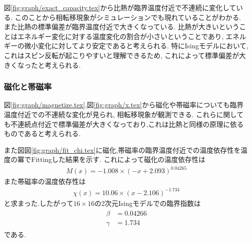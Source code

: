 図\ref{fig:graph/exact_capacity.tex}から比熱が臨界温度付近で不連続に変化している.
このことから相転移現象がシミュレーションでも現れていることがわかる.
また比熱の標準偏差が臨界温度付近で大きくなっている.
比熱が大きいということはエネルギー変化に対する温度変化の割合が小さいということであり,
エネルギーの微小変化に対してより安定であると考えられる.
特にIsingモデルにおいて,これはスピン反転が起こりやすいと理解できるため,
これによって標準偏差が大きくなったと考えられる.
\subsubsection{磁化と帯磁率}
図\ref{fig:graph/magnetize.tex},図\ref{fig:graph/x.tex}から磁化や帯磁率についても臨界温度付近での不連続な変化が見られ,
相転移現象が観測できる.
これらに関しても不連続点付近で標準偏差が大きくなっており,これは比熱と同様の原理に依るものであると考えられる.

また図図\ref{fig:graph/fit_chi.tex}に磁化,帯磁率の臨界温度付近での温度依存性を温度の冪でFittingした結果を示す.
これによって磁化の温度依存性は
\begin{align}
  M(x)=-1.008\times(-x+2.093)^{0.04265}
\end{align}
また帯磁率の温度依存性は
\begin{align}
  \chi(x)=10.06\times(x-2.106)^{-1.734}
\end{align}
と求まった.したがって$16\times16$の2次元Isingモデルでの臨界指数は
\begin{align}
  \begin{split}
    \beta&=0.04266\\
    \gamma&=1.734
  \end{split}
\end{align}
である.
